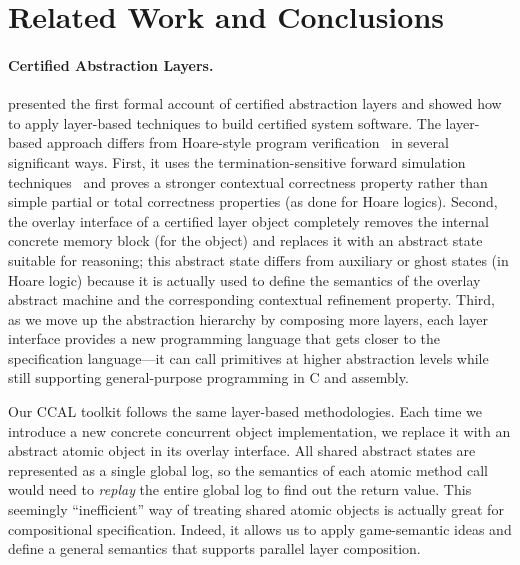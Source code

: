 \section{Related Work and Conclusions}
\label{sec:related}

\paragraph{Certified Abstraction Layers.} \citet{dscal15}
presented the first formal account of certified abstraction layers and
showed how to apply layer-based techniques to build certified system
software. The layer-based approach differs from Hoare-style program
verification~\cite{hoare69,reynolds02,boogie05,nanevski06} in several
significant ways. First, it uses the termination-sensitive forward
simulation techniques~\cite{Lynch95,compcert} and proves a stronger
contextual correctness property rather than simple partial or total
correctness properties (as done for Hoare logics).
Second, the overlay interface of a certified layer object completely
removes the internal concrete memory block (for the object) and
replaces it with an abstract state suitable for reasoning; this
abstract state differs from auxiliary or ghost states (in Hoare
logic) because it is actually used to define the semantics of the
overlay abstract machine and the corresponding contextual refinement
property.
Third, as we move up the abstraction hierarchy by composing more
layers, each layer interface provides a new programming language that gets
closer to the specification language---it can call primitives at
higher abstraction levels while still supporting general-purpose
programming in C and assembly.

Our CCAL toolkit follows the same layer-based methodologies. Each time
we introduce a new concrete concurrent object implementation, we
replace it with an abstract atomic object in its overlay
interface. All shared abstract states are represented as a single
global log, so the semantics of each atomic method call would need to
{\em replay} the entire global log to find out the return value.  This
seemingly ``inefficient'' way of treating shared atomic objects is
actually great for compositional specification. Indeed, it allows us
to apply game-semantic ideas and define a general semantics that
supports parallel layer composition.

